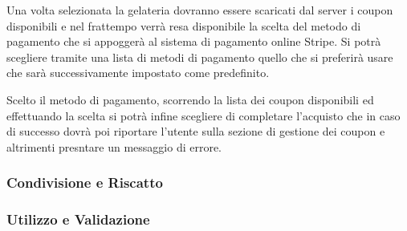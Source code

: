 Una volta selezionata la gelateria dovranno essere scaricati dal server i coupon disponibili e nel frattempo verrà resa disponibile la scelta del metodo di pagamento che si appoggerà al sistema di pagamento online Stripe.
Si potrà scegliere tramite una lista di metodi di pagamento quello che si preferirà usare che sarà successivamente impostato come predefinito.

Scelto il metodo di pagamento, scorrendo la lista dei coupon disponibili ed effettuando la scelta si potrà infine scegliere di completare l'acquisto che in caso di successo dovrà poi riportare l'utente sulla sezione di gestione dei coupon e altrimenti presntare un messaggio di errore.

\subsubsection{Condivisione e Riscatto}

\subsubsection{Utilizzo e Validazione}
































\newpage